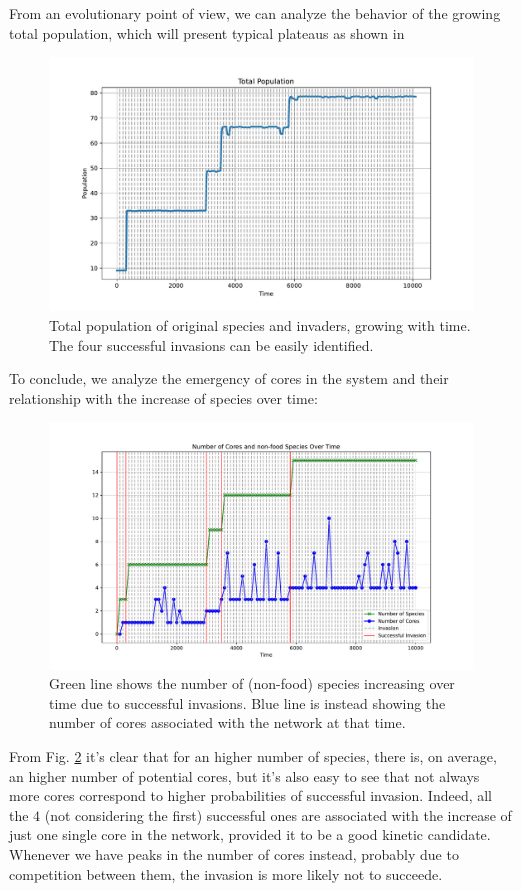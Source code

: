 \documentclass{article}
\begin{document}
From an evolutionary point of view, we can analyze the behavior of the growing total population, which will present typical plateaus as shown in \cite{4} 

\begin{figure}[H]
    \centering
    \includegraphics[width=0.6\linewidth]{Invasions_total.pdf}
    \caption{\small{Total population of original species and invaders, growing with time. The four successful invasions can be easily identified.}}
    \label{Fig. 13}
\end{figure}

To conclude, we analyze the emergency of cores in the system and their relationship with the increase of species over time:

\begin{figure}[H]
    \centering
    \includegraphics[width=0.6\linewidth]{Cores_species.pdf}
    \caption{\small{Green line shows the number of (non-food) species increasing over time due to successful invasions. Blue line is instead showing the number of cores associated with the network at that time. }}
    \label{Fig. 14}
\end{figure}

From Fig. \ref{Fig. 14} it's clear that for an higher number of species, there is, on average, an higher number of potential cores, but it's also easy to see that not always more cores correspond to higher probabilities of successful invasion. Indeed, all the $4$ (not considering the first) successful ones are associated with the increase of just one single core in the network, provided it to be a good kinetic candidate. Whenever we have peaks in the number of cores instead, probably due to competition between them, the invasion is more likely not to succeede. 
\end{document}

